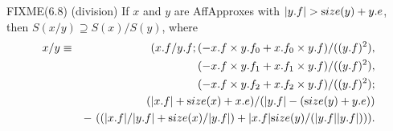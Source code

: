 \begin{proposition}{FIXME(6.8) {\textrm (division)}} If $x$ and $y$ are {\textrm AffApproxes}  with $|y.f| > {\textrm size}(y) + y.e${\textrm ,}
 then $S(x / y) \supseteq
S(x) / S(y)${\textrm ,} where
\begin{eqnarray*}
x / y &\equiv& (x.f / y.f; (-x.f \times y.f_0 + x.f_0 \times y.f)/((y.f)^2),\\&&\qquad  
(-x.f \times y.f_1 + x.f_1 \times y.f)/((y.f)^2), 
\\
&&\qquad 
(-x.f \times y.f_2 + x.f_2 \times y.f)/((y.f)^2); 
\\
&&\qquad (|x.f| + {\textrm size}(x) + x.e) /(|y.f| - ({\textrm size}(y) + y.e))\\
&&  - \
((|x.f|/|y.f| + {\textrm size}(x)/|y.f|) + |x.f| {\textrm size}(y)/(|y.f||y.f|))).
                                           \end{eqnarray*}
\end{proposition}

